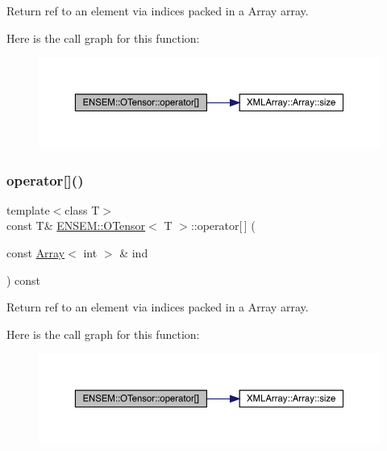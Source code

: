 Return ref to an element via indices packed in a Array array. 

Here is the call graph for this function\+:
\nopagebreak
\begin{figure}[H]
\begin{center}
\leavevmode
\includegraphics[width=350pt]{da/d8a/classENSEM_1_1OTensor_aa649ae52fc364d173eb02db2fbee8172_cgraph}
\end{center}
\end{figure}
\mbox{\label{classENSEM_1_1OTensor_aa649ae52fc364d173eb02db2fbee8172}} 
\subsubsection{\texorpdfstring{operator[]()}{operator[]()}\hspace{0.1cm}{\footnotesize\ttfamily [4/4]}}
{\footnotesize\ttfamily template$<$class T$>$ \\
const T\& \mbox{\hyperlink{classENSEM_1_1OTensor}{E\+N\+S\+E\+M\+::\+O\+Tensor}}$<$ T $>$\+::operator\mbox{[}$\,$\mbox{]} (\begin{DoxyParamCaption}\item[{const \mbox{\hyperlink{classXMLArray_1_1Array}{Array}}$<$ int $>$ \&}]{ind }\end{DoxyParamCaption}) const\hspace{0.3cm}{\ttfamily [inline]}}



Return ref to an element via indices packed in a Array array. 

Here is the call graph for this function\+:
\nopagebreak
\begin{figure}[H]
\begin{center}
\leavevmode
\includegraphics[width=350pt]{da/d8a/classENSEM_1_1OTensor_aa649ae52fc364d173eb02db2fbee8172_cgraph}
\end{center}
\end{figure}
\mbox{\label{classENSEM_1_1OTensor_abe0bd734d08b1140d7794ec760a89435}} 
